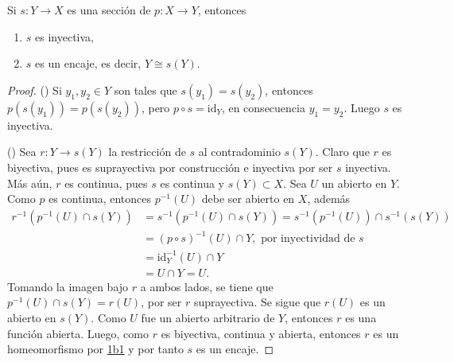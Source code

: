 

\begin{theorem}
Si $s : Y \longrightarrow X$ es una sección de $p : X \longrightarrow Y$, entonces
\begin{enumerate}[label=\textnormal{(\roman*)}]
\item $s$ es inyectiva,
\item $s$ es un encaje, es decir, $Y \cong s(Y)$.
\end{enumerate}
\end{theorem}

\begin{proof}
({\scshape{}}) Si $y_1, y_2 \in Y$ son tales que $s(y_1) = s(y_2)$, entonces $p(s(y_1)) = p(s(y_2))$, pero $p \circ s = \text{id}_Y$, en consecuencia $y_1 = y_2$. Luego $s$ es inyectiva.
\bigskip

({\scshape{}}) Sea $r : Y \longrightarrow s(Y)$ la restricción de $s$ al contradominio $s(Y)$. Claro que $r$ es biyectiva, pues es suprayectiva por construcción e inyectiva por ser $s$ inyectiva. Más aún, $r$ es continua, pues $s$ es continua y $s(Y) \subset X$. Sea $U$ un abierto en $Y$. Como $p$ es continua, entonces $p^{-1}(U)$ debe ser abierto en $X$, además
\begin{align*}
    r^{-1}(p^{-1}(U) \cap s(Y)) &= s^{-1}(p^{-1}(U) \cap s(Y)) = s^{-1}(p^{-1}(U)) \cap s^{-1}(s(Y)) \\
                                &= (p \circ s)^{-1}(U) \cap Y, \text{ por inyectividad de } s \\
                                &= \text{id}^{-1}_Y(U) \cap Y \\
                                &= U \cap Y = U.
\end{align*}
Tomando la imagen bajo $r$ a ambos lados, se tiene que $p^{-1}(U) \cap s(Y) = r(U)$, por ser $r$ suprayectiva. Se sigue que $r(U)$ es un abierto en $s(Y)$. Como $U$ fue un abierto arbitrario de $Y$, entonces $r$ es una función abierta. Luego, como $r$ es biyectiva, continua y abierta, entonces $r$ es un homeomorfismo por \hyperref[card:1b1]{\textsf{1b1}} y por tanto $s$ es un encaje.
\end{proof}
